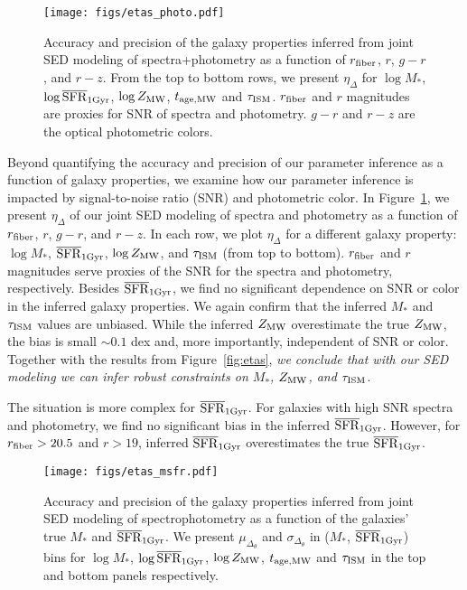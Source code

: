 \begin{figure}
\begin{center}
    \texttt{[image: figs/etas\_photo.pdf]}
    \caption{
        Accuracy and precision of the galaxy properties inferred from joint SED
        modeling of spectra+photometry as a function of $r_{\rm fiber}$, $r$,
        $g-r$, and $r-z$.
        From the top to bottom rows, we present $\eta_\Delta$ for $\log M_*$,
        $\log\overline{\rm SFR}_{\rm 1Gyr}$, $\log Z_{\rm MW}$, $t_{\rm age, MW}$ and $\tau_{\rm ISM}$.
        $r_{\rm fiber}$ and $r$ magnitudes are proxies for SNR of spectra and
        photometry. 
        $g-r$ and $r-z$ are the optical photometric colors. 
    } 
    \label{fig:systematics}
\end{center}
\end{figure}


Beyond quantifying the accuracy and precision of our parameter inference as a
function of galaxy properties, we examine how our parameter inference is
impacted by signal-to-noise ratio (SNR) and photometric color. 
In Figure~\ref{fig:systematics}, we present $\eta_\Delta$ of our joint
SED modeling of spectra and photometry as a function of $r_{\rm fiber}$, $r$,
$g-r$, and $r-z$. 
In each row, we plot $\eta_\Delta$ for a different galaxy property: $\log M_*$,
$\overline{\rm SFR}_{\rm 1Gyr}$, $\log Z_{\rm MW}$, and $\tau_{\rm ISM}$ (from top to bottom).
$r_{\rm fiber}$ and $r$ magnitudes serve proxies of the SNR for the spectra and
photometry, respectively. 
Besides $\overline{\rm SFR}_{\rm 1Gyr}$, we find no significant dependence on SNR or color in the
inferred galaxy properties. 
We again confirm that the inferred $M_*$ and $\tau_{\rm ISM}$ values are
unbiased.
While the inferred $Z_{\rm MW}$ overestimate the true $Z_{\rm MW}$, the bias is
small $\sim 0.1$ dex and, more importantly, independent of SNR or color. 
Together with the results from Figure~\ref{fig:etas}, \emph{we conclude that with our
SED modeling we can infer robust constraints on $M_*$, $Z_{\rm MW}$, and
$\tau_{\rm ISM}$}.

The situation is more complex for $\overline{\rm SFR}_{\rm 1Gyr}$. 
For galaxies with high SNR spectra and photometry, we find no significant bias
in the inferred $\overline{\rm SFR}_{\rm 1Gyr}$. 
However, for $r_{\rm fiber} > 20.5$ and $r > 19$, inferred $\overline{\rm SFR}_{\rm 1Gyr}$
overestimates the true $\overline{\rm SFR}_{\rm 1Gyr}$. 


\begin{figure}
\begin{center}
    \texttt{[image: figs/etas\_msfr.pdf]} \label{fig:etas_msfr}
    \caption{
        Accuracy and precision of the galaxy properties inferred from joint SED
        modeling of spectrophotometry as a function of the galaxies' true $M_*$
        and $\overline{\rm SFR}_{\rm 1Gyr}$. 
        We present $\mu_{\Delta_{\theta}}$ and $\sigma_{\Delta_{\theta}}$ in
        ($M_*$, $\overline{\rm SFR}_{\rm 1Gyr}$) bins for $\log M_*$, $\log\overline{\rm SFR}_{\rm 1Gyr}$, $\log Z_{\rm
        MW}$, $t_{\rm age, MW}$ and $\tau_{\rm ISM}$ in the top and bottom
        panels respectively. 
    }
\end{center}
\end{figure}

